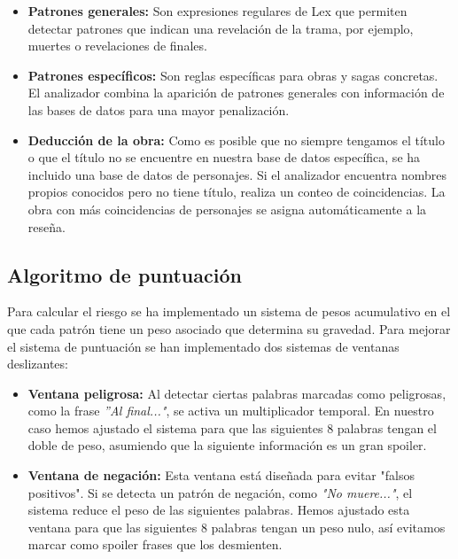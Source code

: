 \documentclass{article}
\begin{document}
\begin{itemize}
    \item \textbf{Patrones generales:} Son expresiones regulares de Lex que permiten detectar patrones que indican una revelación de la trama, por ejemplo, muertes o revelaciones de finales.
    
    \item \textbf{Patrones específicos:} Son reglas específicas para obras y sagas concretas. El analizador combina la aparición de patrones generales con información de las bases de datos para una mayor penalización.
    
    \item \textbf{Deducción de la obra:} Como es posible que no siempre tengamos el título o que el título no se encuentre en nuestra base de datos específica, se ha incluido una base de datos de personajes. Si el analizador encuentra nombres propios conocidos pero no tiene título, realiza un conteo de coincidencias. La obra con más coincidencias de personajes se asigna automáticamente a la reseña.
\end{itemize}

\subsection{Algoritmo de puntuación}

Para calcular el riesgo se ha implementado un sistema de pesos acumulativo en el que cada patrón tiene un peso asociado que determina su gravedad. Para mejorar el sistema de puntuación se han implementado dos sistemas de ventanas deslizantes:

\begin{itemize}
    \item \textbf{Ventana peligrosa:} Al detectar ciertas palabras marcadas como peligrosas, como la frase \textit{''Al final..."}, se activa un multiplicador temporal. En nuestro caso hemos ajustado el sistema para que las siguientes 8 palabras tengan el doble de peso, asumiendo que la siguiente información es un gran spoiler.
    
    \item \textbf{Ventana de negación:} Esta ventana está diseñada para evitar "falsos positivos". Si se detecta un patrón de negación, como \textit{"No muere..."}, el sistema reduce el peso de las siguientes palabras. Hemos ajustado esta ventana para que las siguientes 8 palabras tengan un peso nulo, así evitamos marcar como spoiler frases que los desmienten.
\end{itemize}
\end{document}
